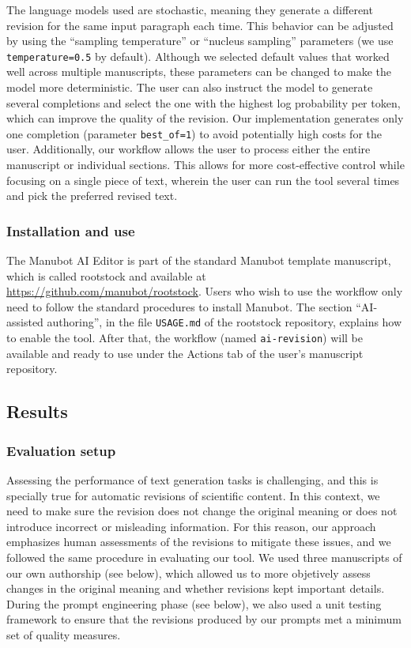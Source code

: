 \documentclass[
]{article}
\begin{document}
The language models used are stochastic, meaning they generate a different revision for the same input paragraph each time.
This behavior can be adjusted by using the ``sampling temperature'' or ``nucleus sampling'' parameters (we use \texttt{temperature=0.5} by default).
Although we selected default values that worked well across multiple manuscripts, these parameters can be changed to make the model more deterministic.
The user can also instruct the model to generate several completions and select the one with the highest log probability per token, which can improve the quality of the revision.
Our implementation generates only one completion (parameter \texttt{best\_of=1}) to avoid potentially high costs for the user.
Additionally, our workflow allows the user to process either the entire manuscript or individual sections.
This allows for more cost-effective control while focusing on a single piece of text, wherein the user can run the tool several times and pick the preferred revised text.

\hypertarget{installation-and-use}{%
\subsubsection{Installation and use}\label{installation-and-use}}

The Manubot AI Editor is part of the standard Manubot template manuscript, which is called rootstock and available at \url{https://github.com/manubot/rootstock}.
Users who wish to use the workflow only need to follow the standard procedures to install Manubot.
The section ``AI-assisted authoring'', in the file \texttt{USAGE.md} of the rootstock repository, explains how to enable the tool.
After that, the workflow (named \texttt{ai-revision}) will be available and ready to use under the Actions tab of the user's manuscript repository.

\hypertarget{sec:results}{%
\subsection{Results}\label{sec:results}}

\hypertarget{evaluation-setup}{%
\subsubsection{Evaluation setup}\label{evaluation-setup}}

Assessing the performance of text generation tasks is challenging, and this is specially true for automatic revisions of scientific content.
In this context, we need to make sure the revision does not change the original meaning or does not introduce incorrect or misleading information.
For this reason, our approach emphasizes human assessments of the revisions to mitigate these issues, and we followed the same procedure in evaluating our tool.
We used three manuscripts of our own authorship (see below), which allowed us to more objetively assess changes in the original meaning and whether revisions kept important details.
During the prompt engineering phase (see below), we also used a unit testing framework to ensure that the revisions produced by our prompts met a minimum set of quality measures.
\end{document}
